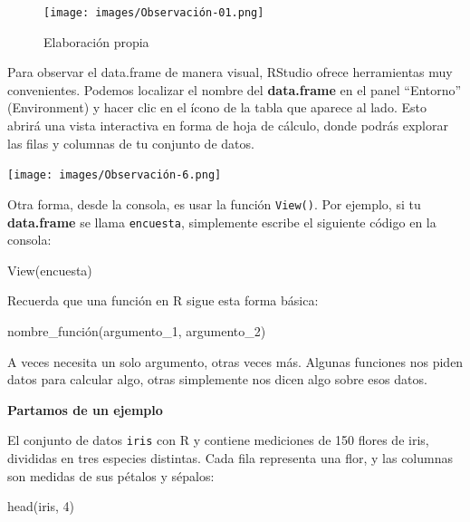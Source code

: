 \documentclass[
  letterpaper,
  DIV=11,
  numbers=noendperiod,
  twoside]{scrreprt}
\newenvironment{Shaded}{\begin{snugshade}}{\end{snugshade}}
\newcommand{\DecValTok}[1]{\textcolor[rgb]{0.68,0.00,0.00}{#1}}
\newcommand{\FunctionTok}[1]{\textcolor[rgb]{0.28,0.35,0.67}{#1}}
\newcommand{\NormalTok}[1]{\textcolor[rgb]{0.00,0.23,0.31}{#1}}
\begin{document}
\begin{figure}[H]

{\centering \texttt{[image: images/Observación-01.png]}

}

\caption{Elaboración propia}

\end{figure}%

Para observar el data.frame de manera visual, RStudio ofrece
herramientas muy convenientes. Podemos localizar el nombre del
\textbf{data.frame} en el panel ``Entorno'' (Environment) y hacer clic
en el ícono de la tabla que aparece al lado. Esto abrirá una vista
interactiva en forma de hoja de cálculo, donde podrás explorar las filas
y columnas de tu conjunto de datos.

\begin{center}
\texttt{[image: images/Observación-6.png]}
\end{center}

Otra forma, desde la consola, es usar la función \texttt{View()}. Por
ejemplo, si tu \textbf{data.frame} se llama \texttt{encuesta},
simplemente escribe el siguiente código en la consola:

\begin{Shaded}
\begin{Highlighting}[]
\FunctionTok{View}\NormalTok{(encuesta)}
\end{Highlighting}
\end{Shaded}

Recuerda que una función en R sigue esta forma básica:

\begin{Shaded}
\begin{Highlighting}[]
\NormalTok{nombre\_función(argumento\_1, argumento\_2)}
\end{Highlighting}
\end{Shaded}

A veces necesita un solo argumento, otras veces más. Algunas funciones
nos piden datos para calcular algo, otras simplemente nos dicen algo
sobre esos datos.

\textbf{Partamos de un ejemplo}

El conjunto de datos \texttt{iris} con R y contiene mediciones de 150
flores de iris, divididas en tres especies distintas. Cada fila
representa una flor, y las columnas son medidas de sus pétalos y
sépalos:

\begin{Shaded}
\begin{Highlighting}[]
\FunctionTok{head}\NormalTok{(iris, }\DecValTok{4}\NormalTok{)}
\end{Highlighting}
\end{Shaded}
\end{document}
